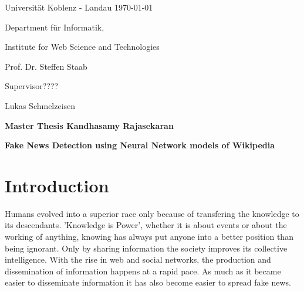 \documentclass[a4paper, 11pt]{article}
\newcommand{\myName}{Kandhasamy Rajasekaran}
\newcommand{\Title}{Fake News Detection using Neural Network models of Wikipedia}
\newcommand{\subject}{Institute for Web Science and Technologies}
\newcommand{\expert}{Prof. Dr. Steffen Staab}%
\newcommand{\supervisor}{Supervisor????} %
\newcommand{\secondSupervisor}{Lukas Schmelzeisen} %
\newcommand{\type}{Master Thesis}
\begin{document}
Universit\"{a}t Koblenz - Landau \hfill \today

Department f\"{u}r Informatik,

\subject{}

\expert{}

\supervisor{}

\secondSupervisor{}

\begin{center}
	\large{\bf \type{}  \myName{}}

	\vspace*{0.5cm}

	\large{\bf \Title}
\end{center}

\setlength{\parskip}{1.5ex plus0.5ex minus 0.5ex}
\begin{abstract}
\frenchspacing
\noindent
The unprecedented growth of production and dissemination of information leads to an unprecedented growth of production and dissemination of Fake news. Fake news hinders the society from progressing by delaying the pursuit of right information. It is very essential to have a mechanism to detect and control fake news. Several organizations uses collaborative efforts of domain experts, a manual process which cannot withstand the proliferation of news production and dissemination. This research work will use Wikipedia as a ground reality and cross check claims automatically. Deep Neural Networks will be used to understand Wikipedia and the performance of different configurations of Neural Networks will be benchmarked against each other and the already available automated fake news detectors.
\end{abstract}
\section{Introduction}
\frenchspacing

Humans evolved into a superior race only because of transfering the knowledge to its descendants. 'Knowledge is Power', whether it is about events or about the working of anything, knowing has always put anyone into a better position than being ignorant. Only by sharing information the society improves its collective intelligence. With the rise in web and social networks, the production and dissemination of information happens at a rapid pace. As much as it became easier to disseminate information it has also become easier to spread fake news.
\end{document}
